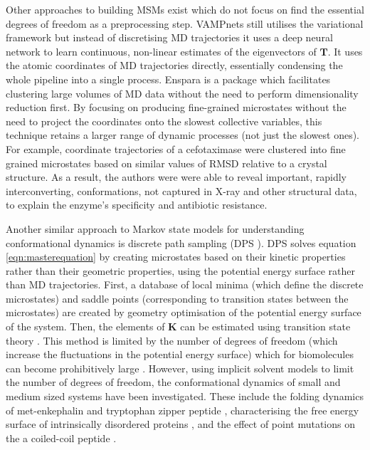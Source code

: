Other approaches to building MSMs exist which do not focus on find the essential degrees of freedom as a preprocessing step. VAMPnets \cite{mardtVAMPnetsDeepLearning2018} still utilises the variational framework but instead of discretising MD trajectories it uses a deep neural network to learn continuous, non-linear estimates of the eigenvectors of $\mathbf{T}$. It uses the atomic coordinates of MD trajectories directly, essentially condensing the whole pipeline into a single process.  Enspara \cite{porterEnsparaModelingMolecular2019} is a package which facilitates clustering large volumes of MD data without the need to perform dimensionality reduction first. By focusing on producing fine-grained microstates without the need to project the coordinates onto the slowest collective variables, this technique retains a larger range of dynamic processes (not just the slowest ones). For example, coordinate trajectories of a cefotaximase \cite{hartModellingProteinsHidden2016} were clustered into fine grained microstates based on similar values of RMSD relative to a crystal structure. As a result, the authors were were able to reveal important, rapidly interconverting, conformations, not captured in X-ray and other structural data, to explain the enzyme's specificity and antibiotic resistance.  

Another similar approach to Markov state models  for understanding conformational dynamics is discrete path sampling (DPS \cite{walesEnergyLandscapesCalculating2006}). DPS solves equation \ref{eqn:masterequation} by creating  microstates based on their kinetic properties rather than their geometric properties, using the potential energy surface rather than MD trajectories. First, a database of local minima (which define the discrete microstates) and saddle points (corresponding to transition states between the microstates) are created by geometry optimisation of the potential energy surface of the system. Then, the elements of $\mathbf{K}$ can be estimated using transition state theory \cite{wales_2004}. This method is limited by the number of degrees of freedom (which increase the fluctuations in the potential energy surface) which for biomolecules can become prohibitively large \cite{noeTransitionNetworksModeling2008}. However, using implicit solvent models to limit the number of degrees of freedom, the conformational dynamics of small and medium sized systems have been investigated. These include the folding dynamics of met-enkephalin \cite{evansFreeEnergyLandscape2003a} and tryptophan zipper peptide \cite{josephStructureThermodynamicsFolding2016}, characterising the free energy surface of intrinsically disordered proteins 
\cite{josephIntrinsicallyDisorderedLandscapes2018}, and the effect of point mutations on the a coiled-coil peptide \cite{roderTransformingEnergyLandscape2017}. 

